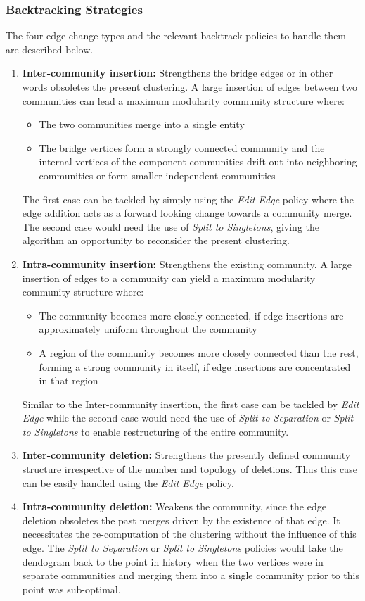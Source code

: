 \documentclass[conference]{IEEEtran}
\begin{document}
\subsubsection{Backtracking Strategies}
The four edge change types and the relevant backtrack policies to handle them 
are described below.
\begin{enumerate}[label=\arabic*.]
 \item \textbf{Inter-community insertion:} Strengthens the bridge edges or 
in other words obsoletes the present clustering. A large insertion of edges 
between two communities can lead a maximum modularity community structure where:
\begin{itemize}
 \item The two communities merge into a single entity
 \item The bridge vertices form a strongly connected community and the internal 
vertices of the component communities drift out into neighboring communities or 
 form smaller independent communities
\end{itemize}
The first case can be tackled by simply using the \emph{Edit Edge} policy 
where the edge addition acts as a forward looking change towards a community 
merge. The second case would need the use of \textit{Split to Singletons}, 
giving the algorithm an opportunity to reconsider the present clustering.
\item \textbf{Intra-community insertion:} Strengthens the existing 
community. A large insertion of edges to a community can yield a maximum 
modularity community structure where:
\begin{itemize}
 \item The community becomes more closely connected, if edge insertions are 
approximately uniform throughout the community
 \item A region of the community becomes more closely connected than the rest, 
forming a strong community in itself, if edge insertions are concentrated 
in that region
\end{itemize}
Similar to the Inter-community insertion, the first case can be tackled by 
\emph{Edit Edge} while the second case would need the use of \emph{Split to 
Separation} or \emph{Split to Singletons} to enable restructuring of the entire 
community.
\item \textbf{Inter-community deletion:} Strengthens the presently defined 
community structure irrespective of the number and topology of deletions. 
Thus this case can be easily handled using the \textit{Edit Edge} 
policy.
\item \textbf{Intra-community deletion:} Weakens the community, since the 
edge deletion obsoletes the past merges driven by the existence of that edge. 
It necessitates the re-computation of the clustering without the 
influence of this edge. The \emph{Split to Separation} or \emph{Split to 
Singletons} policies would take the dendogram back to the point in history 
when the two vertices were in separate communities and merging them into a 
single 
community prior to this point was sub-optimal.
\end{enumerate}
\end{document}
